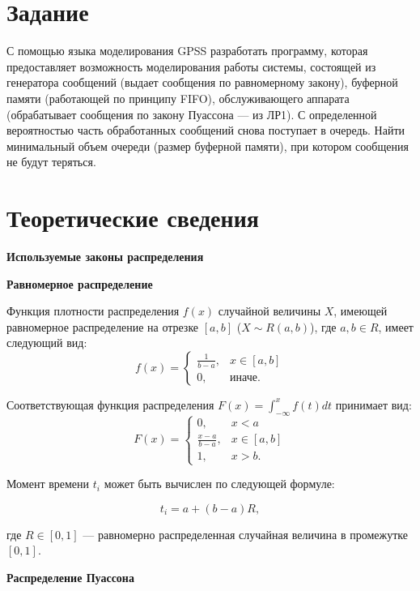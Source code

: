 \section*{Задание}

С помощью языка моделирования GPSS разработать программу, которая предоставляет возможность моделирования работы системы, состоящей из генератора сообщений (выдает сообщения по равномерному закону), буферной памяти (работающей по принципу FIFO), обслуживающего
аппарата (обрабатывает сообщения по закону Пуассона — из ЛР1). С определенной вероятностью часть обработанных сообщений снова поступает в
очередь. Найти минимальный объем очереди (размер буферной памяти),
при котором сообщения не будут теряться.

\section*{Теоретические сведения}
\textbf{Используемые законы распределения}

\textbf{Равномерное распределение}

Функция плотности распределения $f(x)$ случайной величины $X$, имеющей равномерное распределение на отрезке $[a, b]$ ($X \sim R(a, b)$), где $a, b \in R$, имеет следующий вид:
\begin{equation}
	f(x)=\begin{cases}
		\frac{1}{b - a}, & x \in [a, b] \\
		0, & \text{иначе}.
	\end{cases}
\end{equation}

Соответствующая функция распределения $F(x) = \int_{-\infty}^{x}f(t)dt$ принимает вид: 
\begin{equation}
	F(x)=\begin{cases}
		0, & x < a \\
		\frac{x - a}{b - a}, & x \in [a, b] \\
		1, & x > b.
	\end{cases}
\end{equation}

Момент времени $t_i$ может быть вычислен по следующей формуле:

\begin{equation}
	t_i = a + (b - a) R, 
\end{equation}

где $R \in [0, 1]$ --- равномерно распределенная случайная величина в
промежутке~$[0, 1]$.

\textbf{Распределение Пуассона}

